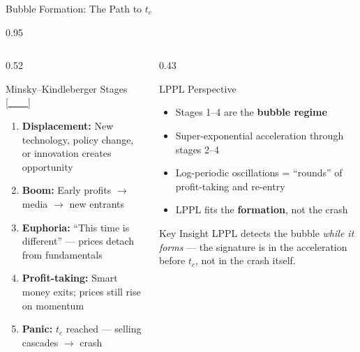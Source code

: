 \documentclass[9pt, aspectratio=169, t]{beamer}
\begin{document}
\begin{frame}{Bubble Formation: The Path to $t_c$}
    \begin{cminipage}{0.95\textwidth}
    {\footnotesize
    \begin{columns}[T]
        \begin{column}{0.52\textwidth}
            \begin{block}{Minsky--Kindleberger Stages {\scriptsize[\href{https://doi.org/10.1007/978-1-349-04338-5}{\textcolor{white}{1978}}]}}
                \begin{enumerate}\setlength{\itemsep}{1pt}
                    \item \textbf{Displacement:} New technology, policy change, or innovation creates opportunity
                    \item \textbf{Boom:} Early profits $\to$ media $\to$ new entrants
                    \item \textbf{Euphoria:} ``This time is different'' --- prices detach from fundamentals
                    \item \textbf{Profit-taking:} Smart money exits; prices still rise on momentum
                    \item \textbf{Panic:} $t_c$ reached --- selling cascades $\to$ crash
                \end{enumerate}
            \end{block}
        \end{column}
        \begin{column}{0.43\textwidth}
            \begin{alertblock}{LPPL Perspective}
                \begin{itemize}\setlength{\itemsep}{1pt}
                    \item Stages 1--4 are the \textbf{bubble regime}
                    \item Super-exponential acceleration through stages 2--4
                    \item Log-periodic oscillations = ``rounds'' of profit-taking and re-entry
                    \item LPPL fits the \textbf{formation}, not the crash
                \end{itemize}
            \end{alertblock}
            \vspace{-1mm}
            \begin{exampleblock}{Key Insight}
                LPPL detects the bubble \textit{while it forms} --- the signature is in the acceleration before $t_c$, not in the crash itself.
            \end{exampleblock}
        \end{column}
    \end{columns}
    }
    \end{cminipage}
\end{frame}
\end{document}

